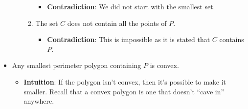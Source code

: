 \begin{itemize}
\begin{itemize}
\begin{enumerate}
			                  \begin{itemize}
				                  \item \textbf{Contradiction}: We did not start with the smallest set.
			                  \end{itemize}
			            \item The set $C$ does not contain all the points of $P$.
			                  \begin{itemize}
				                  \item \textbf{Contradiction}: This is impossible as it is stated that $C$ contains $P$.
			                  \end{itemize}
		            \end{enumerate}

	      \end{itemize}
	\item Any smallest perimeter polygon containing $P$ is convex.
	      \begin{itemize}
		      \item \textbf{Intuition}: If the polygon isn't convex, then it's possible to make it smaller. Recall that a convex polygon is one that doesn't ``cave in'' anywhere.


\end{itemize}
\end{itemize}
